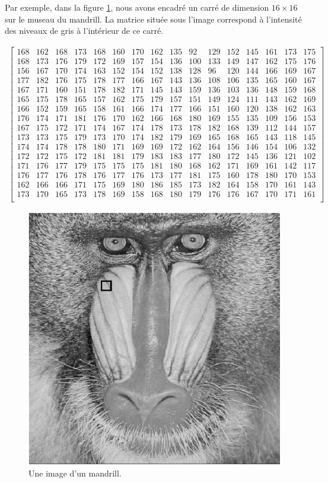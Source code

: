 \documentclass[]{book}
\theoremstyle{definition}
\theoremstyle{definition}
\theoremstyle{definition}
\theoremstyle{remark}
\begin{document}
Par exemple, dans la figure \ref{fig:baboon}, nous avons encadré un carré de dimension \(16\times 16\) sur le museau du mandrill. La matrice située sous l'image correspond à l'intensité des niveaux de gris à l'intérieur de ce carré.

\begin{align*}
\left[
\begin{array}{cccccccccccccccc}
168&162&168&173&168&160&170&162&135&92&129&152&145&161&173&175\\
168&173&176&179&172&169&157&154&136&100&133&149&147&162&175&176\\
156&167&170&174&163&152&154&152&138&128&96&120&144&166&169&167\\
177&182&176&175&178&177&166&167&143&136&108&106&135&165&160&167\\
167&171&160&151&178&182&171&145&143&159&136&103&136&148&159&168\\
165&175&178&165&157&162&175&179&157&151&149&124&111&143&162&169\\
166&152&159&165&158&161&166&174&177&166&151&160&120&138&162&163\\
176&174&171&181&176&170&162&166&168&180&169&155&135&109&156&153\\
167&175&172&171&174&167&174&178&173&178&182&168&139&112&144&157\\
173&173&175&179&173&170&174&182&179&169&165&168&165&143&118&145\\
174&174&178&178&180&171&169&169&172&162&164&156&146&154&106&132\\
172&172&175&172&181&181&179&183&183&177&180&172&145&136&121&102\\
171&176&177&179&175&175&175&181&180&168&162&171&169&161&142&117\\
176&177&176&178&176&177&176&173&177&181&175&160&178&180&170&153\\
162&166&166&171&175&169&180&186&185&173&182&164&158&170&161&143\\
173&170&165&173&178&169&158&168&180&179&176&176&167&170&171&161\\
\end{array}\right]
\end{align*}

\begin{figure}

{\centering \includegraphics[width=0.5\linewidth]{resources/images/baboon} 

}

\caption{Une image d'un mandrill.}\label{fig:baboon}
\end{figure}
\end{document}
